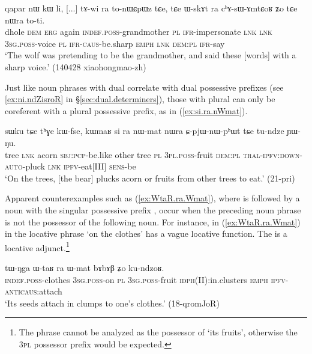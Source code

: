 \begin{exe}
\ex \label{ex:tAwi.ra}
\gll  qapar nɯ kɯ li, [...] tɤ-wi ra to-nɯɕpɯz tɕe, tɕe ɯ-skɤt ra cʰɤ-sɯ-ɤmtɕoʁ ʑo tɕe nɯra to-ti. \\
dhole \textsc{dem} \textsc{erg} again { } \textsc{indef}.\textsc{poss}-grandmother \textsc{pl} \textsc{ifr}-impersonate \textsc{lnk} \textsc{lnk} \textsc{3sg}.\textsc{poss}-voice \textsc{pl} \textsc{ifr}-\textsc{caus}-be.sharp \textsc{emph} \textsc{lnk} \textsc{dem}:\textsc{pl} \textsc{ifr}-say \\
\glt `The wolf was pretending to be the grandmother, and said these [words] with a sharp voice.' (140428 xiaohongmao-zh) 
\end{exe} 

Just like noun phrases with dual  correlate with dual possessive prefixes (see \ref{ex:ni.ndZisroR} in §\ref{sec:dual.determiners}), those with plural  can only be coreferent with a plural possessive prefix, as  in (\ref{ex:si.ra.nWmat}).

\begin{exe}
\ex \label{ex:si.ra.nWmat}
 \gll  sɯku tɕe tʰɣe kɯ-fse, kɯmaʁ si ra nɯ-mat nɯra ɕ-pjɯ-nɯ-pʰɯt tɕe tu-ndze ɲɯ-ŋu.\\
tree \textsc{lnk} acorn \textsc{sbj}:\textsc{pcp}-be.like other tree \textsc{pl} \textsc{3pl}.\textsc{poss}-fruit \textsc{dem}:\textsc{pl} \textsc{tral}-\textsc{ipfv}:\textsc{down}-\textsc{auto}-pluck \textsc{lnk} \textsc{ipfv}-eat[III] \textsc{sens}-be \\
\glt `On the trees, [the bear] plucks acorn or fruits from other trees to eat.' (21-pri)
\end{exe}

Apparent counterexamples such as (\ref{ex:WtaR.ra.Wmat}), where  is followed by a noun with the singular possessive prefix , occur when the preceding noun phrase is not the possessor of the following noun. For instance, in (\ref{ex:WtaR.ra.Wmat})  in the locative phrase  `on the clothes' has a vague locative function. The   is a locative adjunct.\footnote{The phrase   cannot be analyzed as the possessor of  `its fruits', otherwise the \textsc{3pl} possessor prefix  would be expected. }

\begin{exe}
\ex \label{ex:WtaR.ra.Wmat}
 \gll tɯ-ŋga ɯ-taʁ ra ɯ-mat bɤbɤβ ʑo ku-ndzoʁ. \\
 \textsc{indef}.\textsc{poss}-clothes \textsc{3sg}.\textsc{poss}-on \textsc{pl} \textsc{3sg}.\textsc{poss}-fruit \textsc{idph}(II):in.clusters \textsc{emph} \textsc{ipfv}-\textsc{anticaus}:attach \\
\glt `Its seeds attach in clumps to one's clothes.' (18-qromJoR)
\end{exe}

